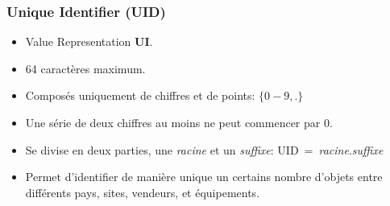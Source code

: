 	\frame
	{
		\frametitle{Unique Identifier (UID)}
		\begin{itemize}
			\item Value Representation \textbf{UI}.
			\item<2-> 64 caract\`eres maximum.
			\item<3-> Compos\'es uniquement de chiffres et de points: $\{0-9,.\}$
			\item<4-> Une s\'erie de deux chiffres au moins ne peut commencer par $0$.
			\item<5-> Se divise en deux parties, une \emph{racine} et un \emph{suffixe}: UID~=~\emph{racine}.\emph{suffixe}
			\item<6-> Permet d'identifier de mani\`ere unique un certains nombre d'objets entre diff\'erents pays, sites, vendeurs, et \'equipements.
		\end{itemize}
	}